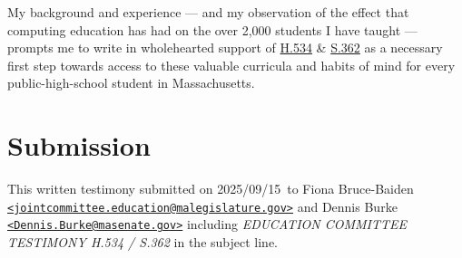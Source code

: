 \documentclass[12pt]{article}%
\def\docdate{2025/09/15}
\begin{document}
My background and experience --- and my observation of the effect that computing education has had on the over 2,000 students I have taught --- prompts me to write in wholehearted support of \href{https://malegislature.gov/Bills/194/H534}{H.534} \& \href{https://malegislature.gov/Bills/194/S362}{S.362} as a necessary first step towards access to these valuable curricula and habits of mind for every public-high-school student in Massachusetts.

\section{Submission}
\label{Submission}

This written testimony submitted on \docdate\ to Fiona Bruce-Baiden \texttt{\href{mailto:jointcommittee.education@malegislature.gov}{<jointcommittee.education\allowbreak @malegislature.gov>}} and Dennis Burke \texttt{\href{mailto:Dennis.Burke\allowbreak @masenate.gov}{<Dennis.Burke@masenate.gov>}} including \textit{EDUCATION COMMITTEE TESTIMONY H.534 / S.362} in the subject line.

\printbibliography %


\end{document}
